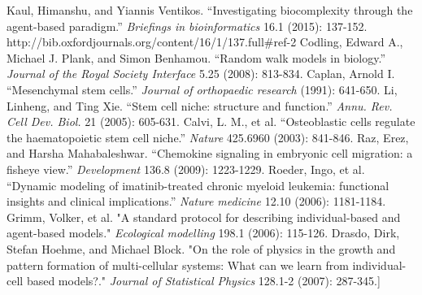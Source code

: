 \documentclass[12pt]{article}
\begin{document}
\begin{thebibliography}{99}
  Kaul, Himanshu, and Yiannis Ventikos. ``Investigating biocomplexity through the agent-based paradigm.'' {\itshape Briefings in bioinformatics} 16.1 (2015): 137-152. http://bib.oxfordjournals.org/content/16/1/137.full\#ref-2
  Codling, Edward A., Michael J. Plank, and Simon Benhamou. ``Random walk models in biology.'' {\itshape Journal of the Royal Society Interface} 5.25 (2008): 813-834.
  Caplan, Arnold I. ``Mesenchymal stem cells.'' {\itshape Journal of orthopaedic research} (1991): 641-650.
  Li, Linheng, and Ting Xie. ``Stem cell niche: structure and function.'' {\itshape Annu. Rev. Cell Dev. Biol.} 21 (2005): 605-631.
  Calvi, L. M., et al. ``Osteoblastic cells regulate the haematopoietic stem cell niche.'' {\itshape Nature} 425.6960 (2003): 841-846.
  Raz, Erez, and Harsha Mahabaleshwar. ``Chemokine signaling in embryonic cell migration: a fisheye view.'' {\itshape Development} 136.8 (2009): 1223-1229.
  Roeder, Ingo, et al. ``Dynamic modeling of imatinib-treated chronic myeloid leukemia: functional insights and clinical implications.'' {\itshape Nature medicine} 12.10 (2006): 1181-1184.
 Grimm, Volker, et al. "A standard protocol for describing individual-based and agent-based models." {\itshape Ecological modelling} 198.1 (2006): 115-126.
 Drasdo, Dirk, Stefan Hoehme, and Michael Block. "On the role of physics in the growth and pattern formation of multi-cellular systems: What can we learn from individual-cell based models?." {\itshape Journal of Statistical Physics} 128.1-2 (2007): 287-345.]
\end{thebibliography}

\end{document}
